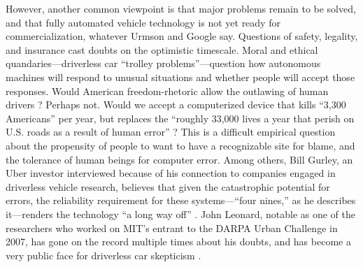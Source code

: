 
However, another common viewpoint is that major problems remain to be
solved, and that fully automated vehicle technology is not yet ready for
commercialization, whatever Urmson and Google 
say. Questions of safety, legality, and insurance cast doubts on the
optimistic timescale. Moral and ethical
quandaries---driverless car ``trolley problems''---question how
autonomous machines will respond to unusual situations and whether
people will accept those responses. Would American freedom-rhetoric
allow the outlawing of human drivers \cite{badgerElon}? 
Perhaps not. Would we accept a computerized device that kills ``3,300
Americans'' per year, but replaces the ``roughly 33,000 lives a year
that perish on U.S. roads as a result of human
error'' \cite{mcfarlandDriverless}?
This is a difficult empirical question about the propensity of people
to want to have a recognizable site for blame, and the tolerance of
human beings for computer error. Among others, Bill Gurley, an Uber
investor interviewed because of his connection to companies engaged in
driverless vehicle research, believes that given the
catastrophic potential for errors, the reliability requirement
for these systems---``four nines,'' as he describes it---renders the
technology ``a long way 
off'' \cite{shontellTop}. John Leonard, notable as one of the researchers who
worked on MIT's entrant to the DARPA Urban Challenge in 2007, has gone
on the record multiple times about his doubts, and has become a very
public face for driverless car skepticism \cite{ramseyWhen} \cite{gomesCircles}.




